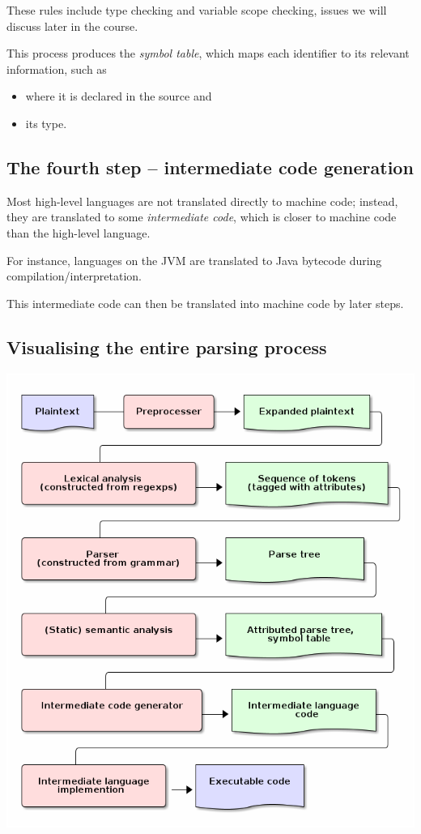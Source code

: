 \documentclass[11pt]{article}
\theoremstyle{definition}
\begin{document}
These rules include type checking and variable scope checking,
issues we will discuss later in the course.

This process produces the \emph{symbol table}, which maps
each identifier to its relevant information,
such as
\begin{itemize}
\item where it is declared in the source and
\item its type.
\end{itemize}

\subsection{The fourth step – intermediate code generation}
\label{sec:org8eea97e}
Most high-level languages are not translated directly to machine code;
instead, they are translated to some \emph{intermediate code},
which is closer to machine code than the high-level language.

For instance, languages on the JVM are translated
to Java bytecode during compilation/interpretation.

This intermediate code can then be translated
into machine code by later steps.

\subsection{Visualising the entire parsing process}
\label{sec:org9875763}
\includegraphics{media/parsing-whole.png}
\end{document}

